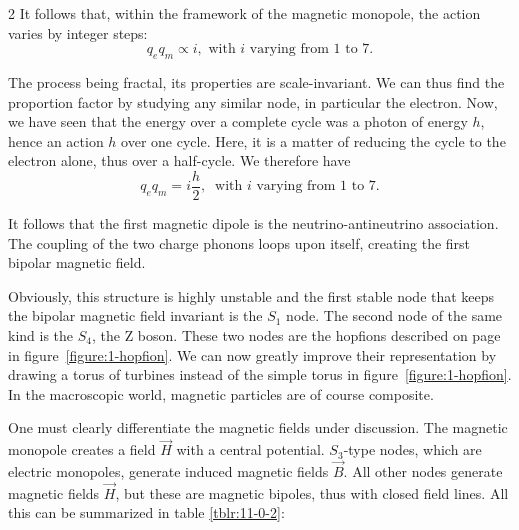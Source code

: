 \begin{multicols}{2}
	It follows that, within the framework of the magnetic monopole, the action varies by integer steps:
	\begin{equation*}
		q_e q_m \propto i, \text{ with } i \text{ varying from 1 to 7.} 
	\end{equation*}
	
	The process being fractal, its properties are scale-invariant. We can thus find the proportion factor by studying any similar node, in particular the electron. Now, we have seen that the energy over a complete cycle was a photon of energy $h$, hence an action $h$ over one cycle. Here, it is a matter of reducing the cycle to the electron alone, thus over a half-cycle. We therefore have
	\begin{equation*}
		q_e q_m = i\frac{h}{2}, \ \text{ with } i \text{ varying from 1 to 7.} 
	\end{equation*}
	
	It follows that the first magnetic dipole is the neutrino-antineutrino association. The coupling of the two charge phonons loops upon itself, creating the first bipolar magnetic field.
	
	Obviously, this structure is highly unstable and the first stable node that keeps the bipolar magnetic field invariant is the $S_1$ node. The second node of the same kind is the $S_4$, the Z boson. These two nodes are the hopfions described on page~\pageref{figure:1-hopfion} in figure~\ref{figure:1-hopfion}. We can now greatly improve their representation by drawing a torus of turbines instead of the simple torus in figure~\ref{figure:1-hopfion}. In the macroscopic world, magnetic particles are of course composite.
	
	One must clearly differentiate the magnetic fields under discussion. The magnetic monopole creates a field $\vec{H}$ with a central potential. $S_3$-type nodes, which are electric monopoles, generate induced magnetic fields $\vec{B}$. All other nodes generate magnetic fields $\vec{H}$, but these are magnetic bipoles, thus with closed field lines. All this can be summarized in table \ref{tblr:11-0-2}:
	\end{multicols}
	\vspace*{-1.0cm}

